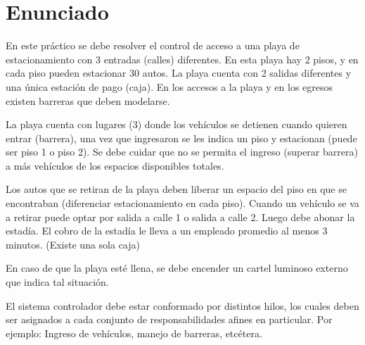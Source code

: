 \documentclass[12pt,a4paper]{article}
\renewcommand{\baselinestretch}{1} %
\begin{document}

\newpage
\renewcommand{\baselinestretch}{1}
\setlength{\parskip}{0.5em}

\section{Enunciado}
\label{enunciado}

En este práctico se debe resolver el control de acceso a una playa de estacionamiento con 3 entradas (calles) diferentes. En esta playa hay 2 pisos, y en cada piso pueden estacionar 30 autos. La playa cuenta con 2 salidas diferentes y una única estación de pago (caja). En los accesos a la playa y en los egresos existen barreras que deben modelarse.

La playa cuenta con lugares (3) donde los vehículos se detienen cuando quieren entrar (barrera), una vez que ingresaron se les indica un piso y estacionan (puede ser piso 1 o piso 2). Se debe cuidar que no se permita el ingreso (superar barrera) a más vehículos de los espacios disponibles totales.

Los autos que se retiran de la playa deben liberar un espacio del piso en que se encontraban (diferenciar estacionamiento en cada piso). Cuando un vehículo se va a retirar puede optar por salida a calle 1 o salida a calle 2.
Luego debe abonar la estadía. El cobro de la estadía le lleva a un empleado promedio al menos 3 minutos. (Existe una sola caja)

En caso de que la playa esté llena, se debe encender un cartel luminoso externo que indica tal situación.

El sistema controlador debe estar conformado por distintos hilos, los cuales deben ser asignados a cada conjunto de responsabilidades afines en particular. Por ejemplo: Ingreso de vehículos, manejo de barreras, etcétera.
\end{document}
